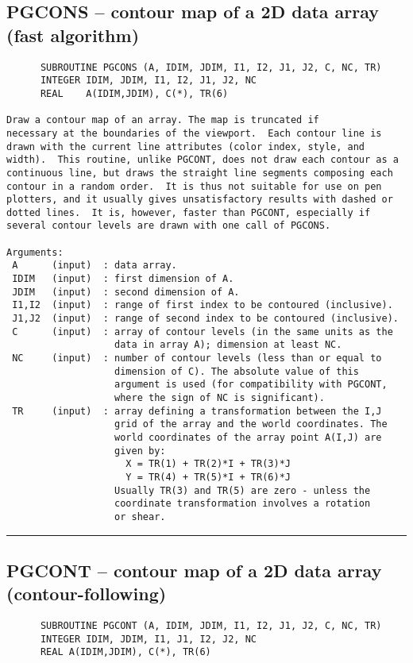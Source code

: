 {\subsection*{PGCONS -- contour map of a 2D data array (fast algorithm) }
\begin{verbatim}
      SUBROUTINE PGCONS (A, IDIM, JDIM, I1, I2, J1, J2, C, NC, TR)
      INTEGER IDIM, JDIM, I1, I2, J1, J2, NC
      REAL    A(IDIM,JDIM), C(*), TR(6)

Draw a contour map of an array. The map is truncated if
necessary at the boundaries of the viewport.  Each contour line is
drawn with the current line attributes (color index, style, and
width).  This routine, unlike PGCONT, does not draw each contour as a
continuous line, but draws the straight line segments composing each
contour in a random order.  It is thus not suitable for use on pen
plotters, and it usually gives unsatisfactory results with dashed or
dotted lines.  It is, however, faster than PGCONT, especially if
several contour levels are drawn with one call of PGCONS.

Arguments:
 A      (input)  : data array.
 IDIM   (input)  : first dimension of A.
 JDIM   (input)  : second dimension of A.
 I1,I2  (input)  : range of first index to be contoured (inclusive).
 J1,J2  (input)  : range of second index to be contoured (inclusive).
 C      (input)  : array of contour levels (in the same units as the
                   data in array A); dimension at least NC.
 NC     (input)  : number of contour levels (less than or equal to
                   dimension of C). The absolute value of this
                   argument is used (for compatibility with PGCONT,
                   where the sign of NC is significant).
 TR     (input)  : array defining a transformation between the I,J
                   grid of the array and the world coordinates. The
                   world coordinates of the array point A(I,J) are
                   given by:
                     X = TR(1) + TR(2)*I + TR(3)*J
                     Y = TR(4) + TR(5)*I + TR(6)*J
                   Usually TR(3) and TR(5) are zero - unless the
                   coordinate transformation involves a rotation
                   or shear.
\end{verbatim}
\hrule


\subsection*{PGCONT -- contour map of a 2D data array (contour-following) }
\begin{verbatim}
      SUBROUTINE PGCONT (A, IDIM, JDIM, I1, I2, J1, J2, C, NC, TR)
      INTEGER IDIM, JDIM, I1, J1, I2, J2, NC
      REAL A(IDIM,JDIM), C(*), TR(6)


\end{verbatim}}
